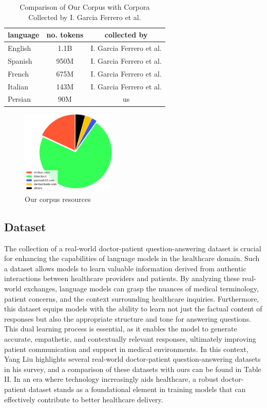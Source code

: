 \documentclass[conference]{IEEEtran}
\begin{document}
	\begin{table}[ht]
		\centering
		\caption{Comparison of Our Corpus with Corpora Collected by I. Garcia Ferrero et al.}
		\begin{tabular}{|l|c|c|}  %
			\hline
			language& no. tokens & collected by \\ \hline
			English & 1.1B & I. Garcia Ferrero et al. \\ \hline
			Spanish & 950M & I. Garcia Ferrero et al.  \\ \hline
			French & 675M & I. Garcia Ferrero et al.  \\ \hline
			Italian& 143M &  I. Garcia Ferrero et al.  \\ \hline
			Persian& 90M & us	\\ \hline
		\end{tabular}
		\label{tab:model_results_on_mcqa}
	\end{table}
	
	\begin{figure}[htbp]
		\centerline{\includegraphics[width=0.4\textwidth]{fig1.png}}
		\caption{Our corpus resources}
		\label{fig1}
	\end{figure}
	
	\subsection{Dataset}
	The collection of a real-world doctor-patient question-answering dataset is crucial for enhancing the capabilities of language models in the healthcare domain. Such a dataset allows models to learn valuable information derived from authentic interactions between healthcare providers and patients. By analyzing these real-world exchanges, language models can grasp the nuances of medical terminology, patient concerns, and the context surrounding healthcare inquiries. Furthermore, this dataset equips models with the ability to learn not just the factual content of responses but also the appropriate structure and tone for answering questions. This dual learning process is essential, as it enables the model to generate accurate, empathetic, and contextually relevant responses, ultimately improving patient communication and support in medical environments. In this context, Yang Liu 
	\cite{b20}
	highlights several real-world doctor-patient question-answering datasets in his survey, and a comparison of these datasets with ours can be found in Table II. In an era where technology increasingly aids healthcare, a robust doctor-patient dataset stands as a foundational element in training models that can effectively contribute to better healthcare delivery.
	
\end{document}
